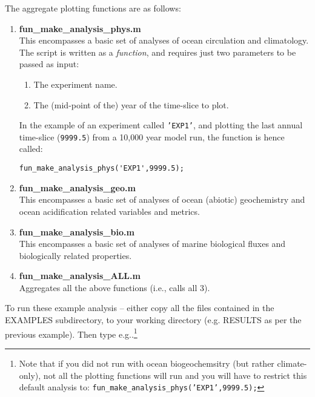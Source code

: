 \documentclass[11pt,fleqn]{book} %
\begin{document}
The aggregate plotting functions are as follows:

\begin{enumerate}[noitemsep]

\vspace{1pt}
\item \footnotesize\textbf{\textsf{fun\_make\_analysis\_phys.m}}\normalsize \\This encompasses a basic set of analyses of ocean circulation and climatology.
\\The script is written as a \textit{function}, and requires just two parameters to be passed as input:
\begin{enumerate}[noitemsep]
\setlength{\itemindent}{.2in}
\item The experiment name.
\item The (mid-point of the) year of the time-slice to plot.
\end{enumerate}
In the example of an experiment called \texttt{'EXP1'}, and plotting the last annual time-slice (\texttt{9999.5}) from a 10,000 year model run, the function is hence called:
\vspace{-2pt}\begin{verbatim}
fun_make_analysis_phys('EXP1',9999.5);
\end{verbatim}\vspace{-2pt}

\vspace{1pt}
\item \footnotesize\textbf{\textsf{fun\_make\_analysis\_geo.m}}\normalsize \\This encompasses a basic set of analyses of ocean (abiotic) geochemistry and ocean acidification related variables and metrics.

\vspace{1pt}
\item \footnotesize\textbf{\textsf{fun\_make\_analysis\_bio.m}}\normalsize \\This encompasses a basic set of analyses of marine biological fluxes and biologically related properties.

\vspace{1pt}
\item \footnotesize\textbf{\textsf{fun\_make\_analysis\_ALL.m}}\normalsize
\\Aggregates all the above functions (i.e., calls all 3).
\end{enumerate}

\vspace{2pt}
To run these example analysis -- either copy all the files contained in the \footnotesize\textsf{EXAMPLES }\normalsize subdirectory, to your working directory (e.g. \footnotesize\textsf{RESULTS }\normalsize as per the previous example). Then type e.g..\footnote{Note that if you did not run with ocean biogeochemsitry (but rather climate-only), not all the plotting functions will run and you will have to restrict this default analysis to: \texttt{fun\_make\_analysis\_phys('EXP1',9999.5);}}
\end{document}
